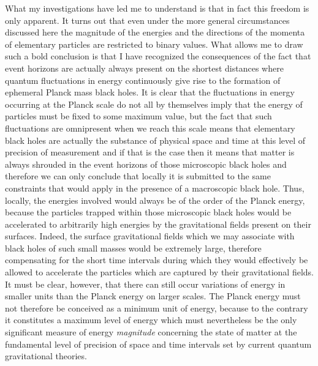 \documentclass[notitlepage,12pt]{report}
\begin{document}
What my investigations have led me to understand is that in fact this freedom is only apparent. It turns out that even under the more general circumstances discussed here the magnitude of the energies and the directions of the momenta of elementary particles are restricted to binary values. What allows me to draw such a bold conclusion is that I have recognized the consequences of the fact that event horizons are actually always present on the shortest distances where quantum fluctuations in energy continuously give rise to the formation of ephemeral Planck mass black holes. It is clear that the fluctuations in energy occurring at the Planck scale do not all by themselves imply that the energy of particles must be fixed to some maximum value, but the fact that such fluctuations are omnipresent when we reach this scale means that elementary black holes are actually the substance of physical space and time at this level of precision of measurement and if that is the case then it means that matter is always shrouded in the event horizons of those microscopic black holes and therefore we can only conclude that locally it is submitted to the same constraints that would apply in the presence of a macroscopic black hole. Thus, locally, the energies involved would always be of the order of the Planck energy, because the particles trapped within those microscopic black holes would be accelerated to arbitrarily high energies by the gravitational fields present on their surfaces. Indeed, the surface gravitational fields which we may associate with black holes of such small masses would be extremely large, therefore compensating for the short time intervals during which they would effectively be allowed to accelerate the particles which are captured by their gravitational fields. It must be clear, however, that there can still occur variations of energy in smaller units than the Planck energy on larger scales. The Planck energy must not therefore be conceived as a minimum unit of energy, because to the contrary it constitutes a maximum level of energy which must nevertheless be the only significant measure of energy \textit{magnitude} concerning the state of matter at the fundamental level of precision of space and time intervals set by current quantum gravitational theories.
\end{document}
